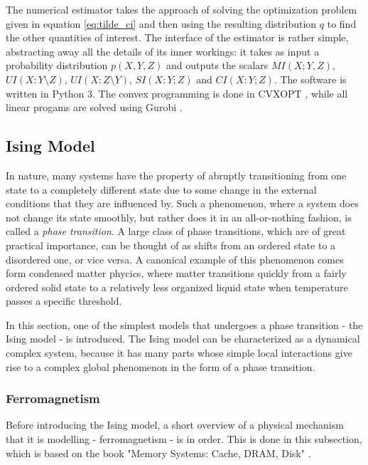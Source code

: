 \documentclass[12pt]{article}
\begin{document}
The numerical estimator takes the approach of solving the optimization problem given in equation \ref{eq:tilde_ci} and then using the resulting distribution $q$ to find the other quantities of interest. The interface of the estimator is rather simple, abstracting away all the details of its inner workings: it takes as input a  probability distribution $p(X, Y, Z)$ and outputs the scalars $MI(X;Y,Z)$, $UI(X:Y \setminus Z)$, $UI(X:Z \setminus Y)$, $SI(X:Y;Z)$ and $CI(X:Y;Z)$. The software is written in Python 3. The convex programming is done in CVXOPT \cite{cvxopt}, while all linear progams are solved using Gurobi \cite{gurobi}. 

\subsection{Ising Model}

In nature, many systems have the property of abruptly transitioning from one state to a completely different state due to some change in the external conditions that they are influenced by. Such a phenomenon, where a system does not change its state smoothly, but rather does it in an all-or-nothing fashion, is called a \textit{phase transition}. A large class of phase transitions, which are of great practical importance, can be thought of as shifts from an ordered state to a disordered one, or vice versa. A canonical example of this phenomenon comes form condensed matter phycics, where matter transitions quickly from a fairly ordered solid state to a relatively less organized liquid state when temperature passes a specific threshold.\cite{inf-flow-ising-commentary}

In this section, one of the simplest models that undergoes a phase transition - the Ising model - is introduced. The Ising model can be characterized as a dynamical complex system, because it has many parts whose simple local interactions give rise to a complex global phenomenon in the form of a phase transition. 

\subsubsection{Ferromagnetism}

Before introducing the Ising model, a short overview of a physical mechanism that it is modelling - ferromagnetism - is in order. This is done in this subsection, which is based on the book "Memory Systems: Cache, DRAM, Disk" \cite{memory-systems-cache-ram}.
\end{document}
